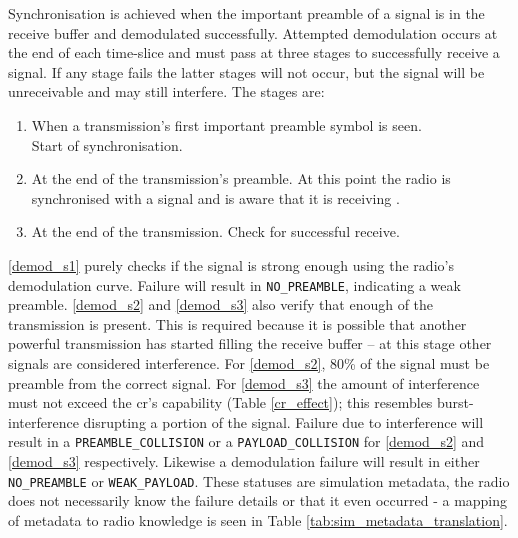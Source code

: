 Synchronisation is achieved when the important preamble of a signal is in the receive buffer and demodulated successfully. Attempted demodulation occurs at the end of each time-slice and must pass at three stages to successfully receive a signal. If any stage fails the latter stages will not occur, but the signal will be unreceivable and may still interfere. The stages are:
\vspace{-2mm}
\begin{enumerate}[label=\textbf{S\arabic*}]
  	\item {When a transmission's first important preamble symbol is seen.	 \\Start of synchronisation.} \label{demod_s1}
  	\item {At the end of the transmission's preamble. At this point the radio is synchronised with a signal and is aware that it is receiving \cite{3YP:LORA_SX12}.} \label{demod_s2} 
  	\item {At the end of the transmission. Check for successful receive.} \label{demod_s3} 
\end{enumerate}
\vspace{-2mm}

\ref{demod_s1} purely checks if the signal is strong enough using the radio's demodulation curve. Failure will result in \texttt{NO\_PREAMBLE}, indicating a weak preamble. \ref{demod_s2} and \ref{demod_s3} also verify that enough of the transmission is present. This is required because it is possible that another powerful transmission has started filling the receive buffer -- at this stage other signals are considered interference. For \ref{demod_s2}, 80\% of the signal must be preamble from the correct signal. For \ref{demod_s3} the amount of interference must not exceed the \ac{cr}'s capability (Table \ref{cr_effect}); this resembles burst-interference disrupting a portion of the signal. Failure due to interference will result in a \texttt{PREAMBLE\_COLLISION} or a \texttt{PAYLOAD\_COLLISION} for \ref{demod_s2} and \ref{demod_s3} respectively. Likewise a demodulation failure will result in either \texttt{NO\_PREAMBLE} or \texttt{WEAK\_PAYLOAD}. These statuses are simulation metadata, the radio does not necessarily know the failure details or that it even occurred - a mapping of metadata to radio knowledge is seen in Table \ref{tab:sim_metadata_translation}.

